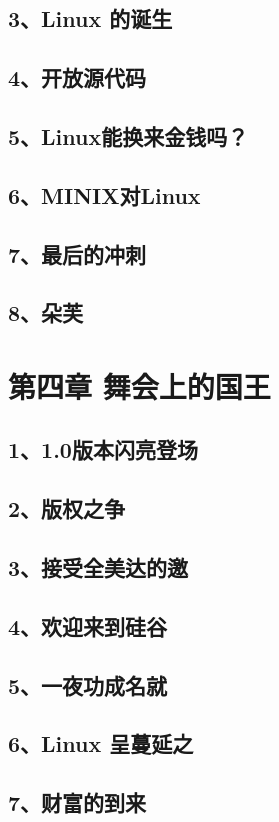 \documentclass[12pt,UTF8]{ctexbook}
\begin{document}
\section{3、Linux 的诞生}
\section{4、开放源代码}
\section{5、Linux能换来金钱吗？}
\section{6、MINIX对Linux}
\section{7、最后的冲刺}
\section{8、朵芙}

\chapter{第四章 舞会上的国王}

\section{1、1.0版本闪亮登场}
\section{2、版权之争}
\section{3、接受全美达的邀}
\section{4、欢迎来到硅谷}
\section{5、一夜功成名就}
\section{6、Linux 呈蔓延之}
\section{7、财富的到来}
\end{document}
